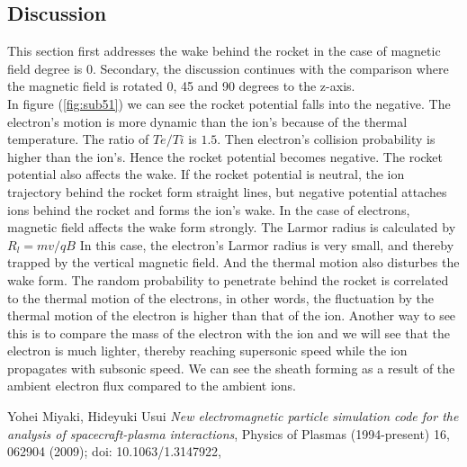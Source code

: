 \documentclass[twoside]{article}
\begin{document}
\begin{multicols}{2} %

\section{Discussion}
This section first addresses the wake behind the rocket in the case of magnetic field degree is 0. Secondary, the discussion continues with the comparison where the magnetic field is rotated 0, 45 and 90 degrees to the z-axis.\\
\indent In figure (\ref{fig:sub51}) we can see the rocket potential falls into the negative.
The electron's motion is more dynamic than the ion's because of the thermal temperature.
The ratio of $Te/Ti$ is $1.5$. Then electron's collision probability is higher than the ion's. Hence the rocket potential becomes negative.
The rocket potential also affects the wake. If the rocket potential is neutral, the ion trajectory behind the rocket form straight lines, but negative potential attaches ions behind the rocket and forms the ion's wake.
In the case of electrons, magnetic field affects the wake form strongly.
The Larmor radius is calculated by $R_l = mv/qB$ 
In this case, the electron's Larmor radius is very small, and thereby trapped by the vertical magnetic field.
And the thermal motion also disturbes the wake form.
The random probability to penetrate behind the rocket is correlated to the thermal motion of the electrons, in other words, the fluctuation by the thermal motion of the electron is higher than that of the ion. Another way to see this is to compare
the mass of the electron with the ion and we will see that the electron is much lighter, thereby reaching supersonic speed
while the ion propagates with subsonic speed. We can see the sheath forming as a result of the ambient electron flux compared to the ambient ions.





\begin{thebibliography}{99} %

  Yohei Miyaki, Hideyuki Usui
  \emph{New electromagnetic particle simulation code for the analysis of spacecraft-plasma
interactions},
Physics of Plasmas (1994-present) 16,
062904 (2009); doi: 10.1063/1.3147922,


\end{thebibliography}
\end{multicols}
\end{document}

